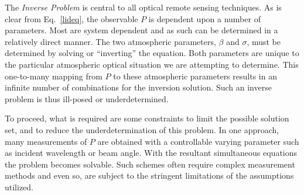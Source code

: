 The {\em Inverse Problem} is central to all
optical remote sensing techniques. As is clear from Eq.~{\ref{lideq}},
the observable $P$ is dependent upon a number of
parameters. Most are system dependent and as such
can be determined in a relatively direct manner. 
The two atmospheric parameters, $\beta$ and $\sigma$, must be determined
by solving or ``inverting'' the equation.
Both parameters are unique to the particular 
atmospheric optical situation we are attempting to
determine. This one-to-many mapping from
$P$ to these atmospheric parameters results
in an infinite number of combinations for the inversion solution.
Such an inverse problem is thus ill-posed or underdetermined.

To proceed, what is required are some constraints
to limit the possible solution set, and to
reduce the underdetermination of this problem.
In one approach, many measurements of $P$ are obtained 
with a controllable varying parameter such as
incident wavelength or beam angle. With the resultant simultaneous equations
the problem becomes solvable.
Such schemes often require complex measurement methods
and even so, are subject to the stringent limitations
of the assumptions utilized.

